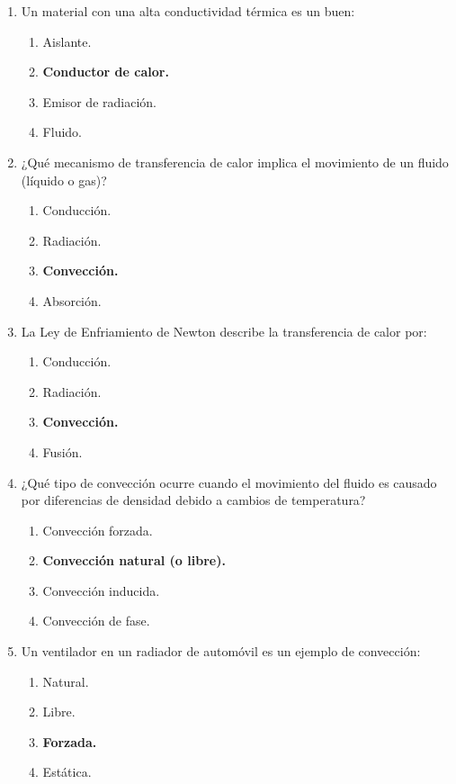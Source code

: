 \documentclass{article}
\begin{document}
\begin{enumerate}[label=\arabic*.]
    \item Un material con una alta conductividad térmica es un buen:
    \begin{enumerate}[label=\alph*)]
        \item Aislante.
        \item \textbf{Conductor de calor.}
        \item Emisor de radiación.
        \item Fluido.
    \end{enumerate}

    \item ¿Qué mecanismo de transferencia de calor implica el movimiento de un fluido (líquido o gas)?
    \begin{enumerate}[label=\alph*)]
        \item Conducción.
        \item Radiación.
        \item \textbf{Convección.}
        \item Absorción.
    \end{enumerate}

    \item La Ley de Enfriamiento de Newton describe la transferencia de calor por:
    \begin{enumerate}[label=\alph*)]
        \item Conducción.
        \item Radiación.
        \item \textbf{Convección.}
        \item Fusión.
    \end{enumerate}

    \item ¿Qué tipo de convección ocurre cuando el movimiento del fluido es causado por diferencias de densidad debido a cambios de temperatura?
    \begin{enumerate}[label=\alph*)]
        \item Convección forzada.
        \item \textbf{Convección natural (o libre).}
        \item Convección inducida.
        \item Convección de fase.
    \end{enumerate}

    \item Un ventilador en un radiador de automóvil es un ejemplo de convección:
    \begin{enumerate}[label=\alph*)]
        \item Natural.
        \item Libre.
        \item \textbf{Forzada.}
        \item Estática.
    \end{enumerate}


\end{enumerate}
\end{document}
